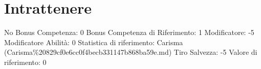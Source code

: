 \section{Intrattenere}\label{intrattenere}

\begin{description}
\tightlist
\item[Tags: ABI]
No Bonus Competenza: 0 Bonus Competenza di Riferimento: 1 Modificatore:
-5 Modificatore Abilità: 0 Statistica di riferimento: Carisma
(Carisma\%20829cf0e6cc0f4becb331147b868ba59e.md) Tiro Salvezza: -5
Valore di riferimento: 0
\end{description}
